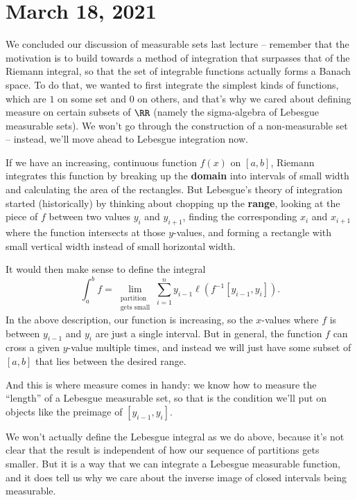 \pagebreak\section*{March 18, 2021}

We concluded our discussion of measurable sets last lecture -- remember that the motivation is to build towards a method of integration that surpasses that of the Riemann integral, so that the set of integrable functions actually forms a Banach space. To do that, we wanted to first integrate the simplest kinds of functions, which are $1$ on some set and $0$ on others, and that's why we cared about defining measure on certain subsets of $\RR$ (namely the sigma-algebra of Lebesgue measurable sets). We won't go through the construction of a non-measurable set -- instead, we'll move ahead to Lebesgue integration now. 

\begin{fact}[Informal]
If we have an increasing, continuous function $f(x)$ on $[a, b]$, Riemann integrates this function by breaking up the \textbf{domain} into intervals of small width and calculating the area of the rectangles. But Lebesgue's theory of integration started (historically) by thinking about chopping up the \textbf{range}, looking at the piece of $f$ between two values $y_i$ and $y_{i+1}$, finding the corresponding $x_i$ and $x_{i+1}$ where the function intersects at those $y$-values, and forming a rectangle with small vertical width instead of small horizontal width. 
\end{fact}

It would then make sense to define the integral
\[
    \int_a^b f = \lim_{\substack{\text{partition} \\ \text{gets small}}} \sum_{i=1}^n y_{i-1} \ell(f^{-1}[y_{i-1}, y_i]).
\]
In the above description, our function is increasing, so the $x$-values where $f$ is between $y_{i-1}$ and $y_i$ are just a single interval. But in general, the function $f$ can cross a given $y$-value multiple times, and instead we will just have some subset of $[a, b]$ that lies between the desired range. 

And this is where measure comes in handy: we know how to measure the ``length'' of a Lebesgue measurable set, so that is the condition we'll put on objects like the preimage of $[y_{i-1}, y_i]$. 

We won't actually define the Lebesgue integral as we do above, because it's not clear that the result is independent of how our sequence of partitions gets smaller. But it is a way that we can integrate a Lebesgue measurable function, and it does tell us why we care about the inverse image of closed intervals being measurable. 

